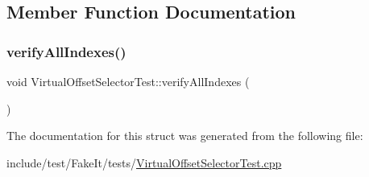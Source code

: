 \subsection{Member Function Documentation}
\mbox{\label{structVirtualOffsetSelectorTest_a5fab79e5acfa723ce2995eee1b69264c}} 
\subsubsection{\texorpdfstring{verifyAllIndexes()}{verifyAllIndexes()}}
{\footnotesize\ttfamily void Virtual\+Offset\+Selector\+Test\+::verify\+All\+Indexes (\begin{DoxyParamCaption}{ }\end{DoxyParamCaption})\hspace{0.3cm}{\ttfamily [inline]}}



The documentation for this struct was generated from the following file\+:\begin{DoxyCompactItemize}
\item 
include/test/\+Fake\+It/tests/\mbox{\hyperlink{VirtualOffsetSelectorTest_8cpp}{Virtual\+Offset\+Selector\+Test.\+cpp}}\end{DoxyCompactItemize}
